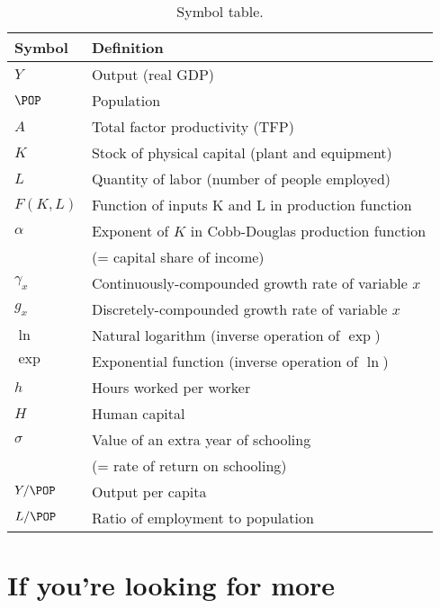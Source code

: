 \begin{table}[H]
\centering
\caption{Symbol table.}
\begin{tabular*}{0.9\textwidth}{l@{\extracolsep{\fill}}l}
\toprule
Symbol & Definition\\
\midrule
$Y$                            &Output (real GDP)\\
$\POP$                      &Population\\
$A$                            &Total factor productivity (TFP)\\
$K$                            &Stock of physical capital (plant and equipment)\\
$L$                            &Quantity of labor (number of people employed)\\
$F(K,L)$                    &Function of inputs K and L in production function\\
$\alpha$                     &Exponent of $K$ in Cobb-Douglas production function \\
                            &(= capital share of income)\\
$\gamma_x$                  &Continuously-compounded growth rate of variable $x$\\
$g_x$                       &Discretely-compounded growth rate of variable $x$\\
$\ln$                        &Natural logarithm (inverse operation of $\exp$)\\
$\exp$                      &Exponential function (inverse operation of $\ln$)\\
$h$                         &Hours worked per worker\\
$H$                         &Human capital\\
$\sigma$                     &Value of an extra year of schooling \\
                            &(= rate of return on schooling)\\
$Y/\POP$                        &Output per capita\\
$L/\POP$                        &Ratio of employment to population\\
\bottomrule
\end{tabular*}
\end{table}

\section*{If you're looking for more}

